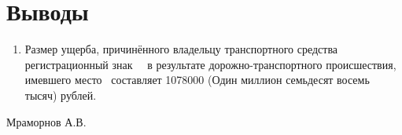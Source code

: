 \section{Выводы}
%
%
\begin{enumerate}
\item Размер ущерба, причинённого владельцу  транспортного средства \tc\, регистрационный знак \, \, в результате дорожно-транспортного происшествия, имевшего место \,  составляет 1078000 (Один миллион семьдесят восемь тысяч) рублей.
\end{enumerate}
\vspace{10mm}
      \hfill                        {Мраморнов А.В.}
\vspace{7mm}
\relax

